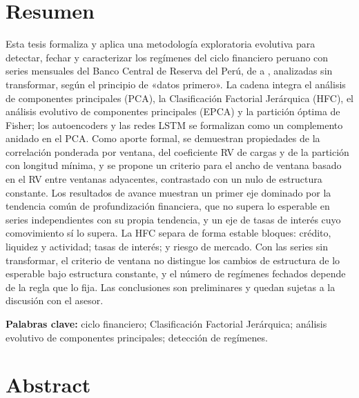 \chapter*{Resumen}

Esta tesis formaliza y aplica una metodología exploratoria evolutiva para detectar, fechar y
caracterizar los regímenes del ciclo financiero peruano con \nSeries{} series mensuales del Banco
Central de Reserva del Perú, de \fechaInicioNiveles{} a \fechaFinDatos{}, analizadas sin
transformar, según el principio de «datos primero». La cadena integra el análisis de componentes
principales (PCA), la Clasificación Factorial Jerárquica (HFC), el análisis evolutivo de
componentes principales (EPCA) y la partición óptima de Fisher; los autoencoders y las redes
LSTM se formalizan como un complemento anidado en el PCA. Como aporte formal, se demuestran
propiedades de la correlación ponderada por ventana, del coeficiente RV de cargas y de la
partición con longitud mínima, y se propone un criterio para el ancho de ventana basado en el RV
entre ventanas adyacentes, contrastado con un nulo de estructura constante. Los resultados de avance muestran un primer eje dominado por
la tendencia común de profundización financiera, que no supera lo esperable en series
independientes con su propia tendencia, y un eje de tasas de interés cuyo comovimiento sí lo
supera. La HFC separa de forma estable \clasesHfcMenor{} bloques: crédito, liquidez y actividad; tasas de
interés; y riesgo de mercado. Con las series sin transformar, el criterio de ventana no distingue
los cambios de estructura de lo esperable bajo estructura constante, y el número de regímenes
fechados depende de la regla que lo fija. Las conclusiones son preliminares y quedan sujetas a
la discusión con el asesor.

\medskip
\textbf{Palabras clave:} ciclo financiero; Clasificación Factorial Jerárquica; análisis evolutivo
de componentes principales; detección de regímenes.

\chapter*{Abstract}

